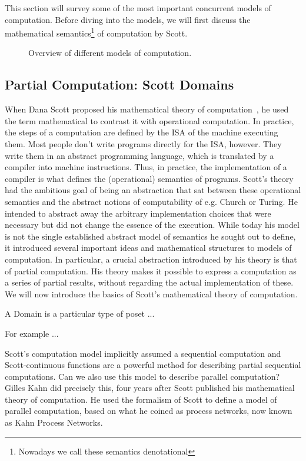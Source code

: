 This section will survey some of the most important concurrent models of computation. Before diving into the models, we will first discuss the mathematical semantics\footnote{Nowadays we call these semantics denotational} of computation by Scott.

\begin{figure}[h]
	\centering
   \resizebox{0.95\textwidth}{!}{}
	\caption{Overview of different models of computation.}
	\label{fig:dataflow_mocs}
\end{figure}



\subsection{Partial Computation: Scott Domains}

When Dana Scott proposed his mathematical theory of computation~\cite{scott1970}, he used the term mathematical to contrast it with operational computation.
In practice, the steps of a computation are defined by the \ac{ISA} of the machine executing them.
Most people don't write programs directly for the \ac{ISA}, however. They write them in an abstract programming language, which is translated by a compiler into machine instructions.
Thus, in practice, the implementation of a compiler is what defines the (operational) semantics of programs.
Scott's theory had the ambitious goal of being an abstraction that sat between these operational semantics and the abstract notions of computability of e.g. Church or Turing.
He intended to abstract away the arbitrary implementation choices that were necessary but did not change the essence of the execution.
While today his model is not the single established abstract model of semantics he sought out to define, it introduced several important ideas and mathematical structures to models of computation.
In particular, a crucial abstraction introduced by his theory is that of partial computation.
His theory makes it possible to express a computation as a series of partial results, without regarding the actual implementation of these.
We will now introduce the basics of Scott's mathematical theory of computation.


A Domain is a particular type of \ac{poset} ... 

For example ...


Scott's computation model implicitly assumed a sequential computation and Scott-continuous functions are a powerful method for describing partial sequential computations.
Can we also use this model to describe parallel computation?
Gilles Kahn did precisely this, four years after Scott published his mathematical theory of computation. 
He used the formalism of Scott to define a model of parallel computation, based on what he coined as process networks, now known as Kahn Process Networks.


